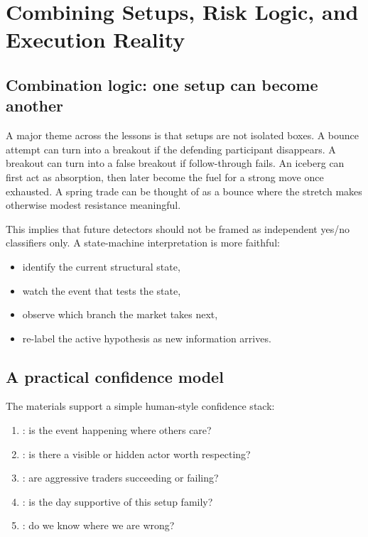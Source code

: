 \section{Combining Setups, Risk Logic, and Execution Reality}

\subsection{Combination logic: one setup can become another}

A major theme across the lessons is that setups are not isolated boxes. A bounce attempt can
turn into a breakout if the defending participant disappears. A breakout can turn into a false
breakout if follow-through fails. An iceberg can first act as absorption, then later become the
fuel for a strong move once exhausted. A spring trade can be thought of as a bounce where the
stretch makes otherwise modest resistance meaningful.

This implies that future detectors should not be framed as independent yes/no classifiers only.
A state-machine interpretation is more faithful:

\begin{itemize}[leftmargin=1.4em]
  \item identify the current structural state,
  \item watch the event that tests the state,
  \item observe which branch the market takes next,
  \item re-label the active hypothesis as new information arrives.
\end{itemize}

\subsection{A practical confidence model}

The materials support a simple human-style confidence stack:

\begin{enumerate}[leftmargin=1.4em]
  \item {}: is the event happening where others care?
  \item {}: is there a visible or hidden actor worth respecting?
  \item {}: are aggressive traders succeeding or failing?
  \item {}: is the day supportive of this setup family?
  \item {}: do we know where we are wrong?
\end{enumerate}

